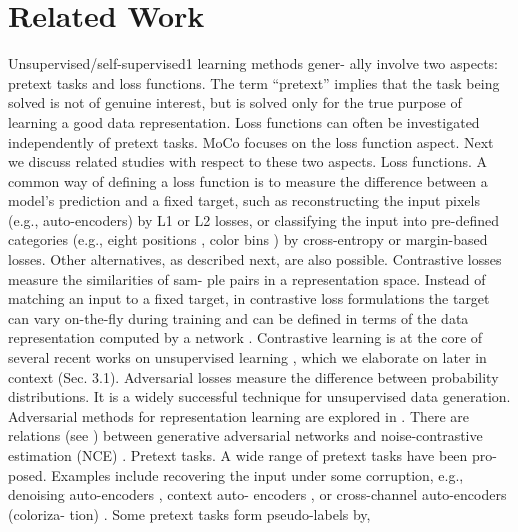 \documentclass[10pt,twocolumn]{article}  %
\begin{document}
\section{Related Work}
Unsupervised/self-supervised1 learning methods gener-
ally involve two aspects: pretext tasks and loss functions.
The term “pretext” implies that the task being solved is not
of genuine interest, but is solved only for the true purpose
of learning a good data representation. Loss functions can
often be investigated independently of pretext tasks. MoCo
focuses on the loss function aspect. Next we discuss related
studies with respect to these two aspects.
Loss functions. A common way of deﬁning a loss function
is to measure the difference between a model's prediction
and a ﬁxed target, such as reconstructing the input pixels
(e.g., auto-encoders) by L1 or L2 losses, or classifying the
input into pre-deﬁned categories (e.g., eight positions \cite{13_doersch2015unsupervised},
color bins \cite{64_zhang2016colorful}) by cross-entropy or margin-based losses.
Other alternatives, as described next, are also possible.
Contrastive losses \cite{29_hadsell2006dimensionality} measure the similarities of sam-
ple pairs in a representation space. Instead of matching an
input to a ﬁxed target, in contrastive loss formulations the
target can vary on-the-ﬂy during training and can be deﬁned
in terms of the data representation computed by a network
\cite{29_hadsell2006dimensionality}. Contrastive learning is at the core of several recent
works on unsupervised learning \cite{61_wu2018unsupervised, 46_oord2018representation, 36_hjelm2019learning, 66_zhuang2019local, 35_henaff2019data, 56_tian2019contrastive, 2_bachman2019learning},
which we elaborate on later in context (Sec. 3.1).
Adversarial losses \cite{24_goodfellow2014generative} measure the difference between
probability distributions. It is a widely successful technique
for unsupervised data generation. Adversarial methods for
representation learning are explored in \cite{15_donahue2016adversarial, 16_dumoulin2016adversarial}. There are
relations (see \cite{24_goodfellow2014generative}) between generative adversarial networks
and noise-contrastive estimation (NCE) \cite{28_gutmann2010noise}.
Pretext tasks. A wide range of pretext tasks have been pro-
posed. Examples include recovering the input under some
corruption, e.g., denoising auto-encoders \cite{58_vincent2010stacked}, context auto-
encoders \cite{48_pathak2016context}, or cross-channel auto-encoders (coloriza-
tion) \cite{64_zhang2016colorful, 65_larsson2016learning}. Some pretext tasks form pseudo-labels by,
\end{document}
